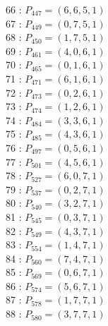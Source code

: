 \documentclass{article}
\begin{document}
{\begin{multicols}{3}
66 : $P_{447}=( 6, 6, 5, 1 )$\\
67 : $P_{449}=( 0, 7, 5, 1 )$\\
68 : $P_{450}=( 1, 7, 5, 1 )$\\
69 : $P_{461}=( 4, 0, 6, 1 )$\\
70 : $P_{465}=( 0, 1, 6, 1 )$\\
71 : $P_{471}=( 6, 1, 6, 1 )$\\
72 : $P_{473}=( 0, 2, 6, 1 )$\\
73 : $P_{474}=( 1, 2, 6, 1 )$\\
74 : $P_{484}=( 3, 3, 6, 1 )$\\
75 : $P_{485}=( 4, 3, 6, 1 )$\\
76 : $P_{497}=( 0, 5, 6, 1 )$\\
77 : $P_{501}=( 4, 5, 6, 1 )$\\
78 : $P_{527}=( 6, 0, 7, 1 )$\\
79 : $P_{537}=( 0, 2, 7, 1 )$\\
80 : $P_{540}=( 3, 2, 7, 1 )$\\
81 : $P_{545}=( 0, 3, 7, 1 )$\\
82 : $P_{549}=( 4, 3, 7, 1 )$\\
83 : $P_{554}=( 1, 4, 7, 1 )$\\
84 : $P_{560}=( 7, 4, 7, 1 )$\\
85 : $P_{569}=( 0, 6, 7, 1 )$\\
86 : $P_{574}=( 5, 6, 7, 1 )$\\
87 : $P_{578}=( 1, 7, 7, 1 )$\\
88 : $P_{580}=( 3, 7, 7, 1 )$\\
\end{multicols}


%


%


}%
\end{document}

